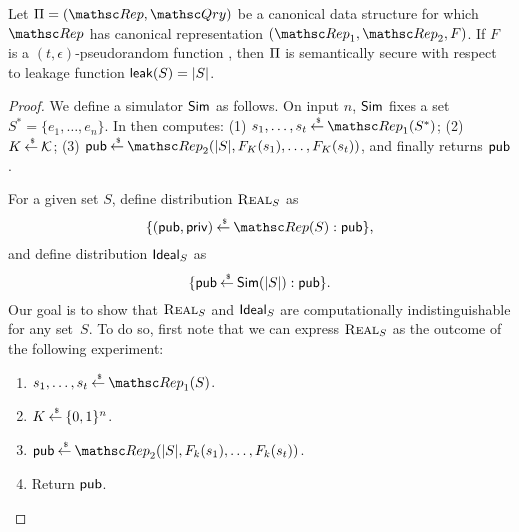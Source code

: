 \begin{theorem}
Let $\setprim=(\Rep, \Qry)$ be a canonical data structure for which $\Rep$ has canonical representation
$(\Rep_1, \Rep_2, F)$. If $F$ is a $(t, \epsilon)$-pseudorandom
function , then $\Pi$ is semantically secure
with respect to leakage function ${\sf leak}(S) = |S|$.
\end{theorem}
\begin{proof}
We define a simulator ${\sf Sim}$ as follows. On input $n$, ${\sf Sim}$ fixes a
set $S^*=\{e_1, \ldots, e_n\}$. In then computes:
(1) $s_1, \ldots, s_t \getsr \Rep_1(S^*)$;
(2) $K {\:\stackrel{{\scriptscriptstyle \hspace{0.2em}\$}} {\leftarrow}\:} {\cal K}$;
(3) $\pubaux \getsr \Rep_2(|S|, F_K(s_1), \ldots, F_K(s_t))$, and
finally returns ${\sf pub}$.

\def\hyb{\mbox{{\sc Hyb}}}

For a given set $S$, define distribution $\mbox{{\sc Real}}_S$ as
\[ \{ (\pubaux, \privaux) \getsr \Rep(S) : \pubaux\},\]
and define distribution $\mbox{{\sf Ideal}}_S$ as
\[ \{ {\sf pub} {\:\stackrel{{\scriptscriptstyle \hspace{0.2em}\$}} {\leftarrow}\:} {\sf Sim}(|S|) : {\sf pub} \}.\]
Our goal is to show that $\mbox{{\sc Real}}_S$ and $\mbox{{\sf Ideal}}_S$ are computationally
indistinguishable for any set~$S$. 
To do so, first note that we can express $\mbox{{\sc Real}}_S$ as the outcome of
the following experiment: 
\begin{enumerate}
\item $s_1, \ldots, s_t \getsr \Rep_1(S)$.
\item $K {\:\stackrel{{\scriptscriptstyle \hspace{0.2em}\$}} {\leftarrow}\:} \{0,1\}^n$.
\item $\pubaux \getsr \Rep_2(|S|, F_k(s_1), \ldots, F_k(s_t))$.
\item Return ${\sf pub}$.
\end{enumerate}


\end{proof}
